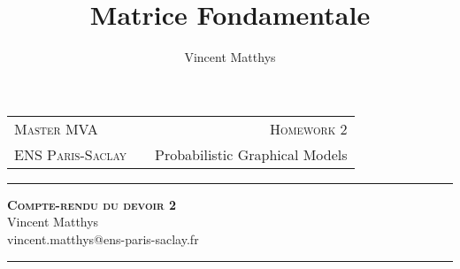 \documentclass[12pt,a4paper,onecolumn]{article}
\title{Matrice Fondamentale}
\author{Vincent Matthys}
\begin{document}
\begin{tabularx}{0.8\textwidth}{@{} l X r @{} }
	{\textsc{Master MVA}}     &  & \textsc{Homework 2}              \\
	\textsc{ENS Paris-Saclay} &  & {Probabilistic Graphical Models} \\
\end{tabularx}
\vspace{1.5cm}
\begin{center}
	\rule[11pt]{5cm}{0.5pt}

	\textbf{\LARGE \textsc{Compte-rendu du devoir 2}}
	\vspace{0.5cm}\\
	Vincent Matthys\\
	vincent.matthys@ens-paris-saclay.fr\\
	\rule{5cm}{0.5pt}
	\vspace{1.5cm}
\end{center}
\end{document}
